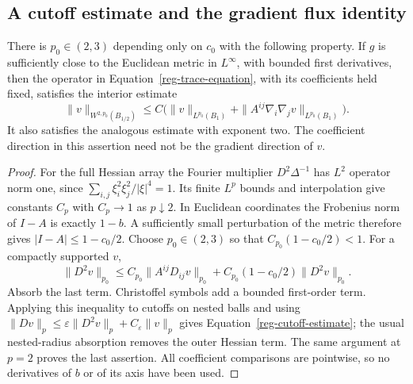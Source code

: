 \subsection{A cutoff estimate and the gradient flux identity}

\begin{lemma}
\label{reg-cutoff}
There is $p_0\in(2,3)$ depending only on $c_0$ with the following
property. If $g$ is sufficiently close to the Euclidean metric in
$L^\infty$, with bounded first derivatives, then the operator in
Equation~\eqref{reg-trace-equation}, with its coefficients held fixed,
satisfies the interior estimate
\begin{equation}
 \|v\|_{W^{2,p_0}(B_{1/2})}
 \le C\bigl(\|v\|_{L^{p_0}(B_1)}
                 +\|A^{ij}\nabla_i\nabla_jv\|_{L^{p_0}(B_1)}\bigr).
 \label{reg-cutoff-estimate}
\end{equation}
It also satisfies the analogous estimate with exponent two.
The coefficient direction in this assertion need not be the gradient
direction of $v$.
\end{lemma}

\begin{proof}
For the full Hessian array the Fourier multiplier
$D^2\Delta^{-1}$ has $L^2$ operator norm one, since
$\sum_{i,j}\xi_i^2\xi_j^2/|\xi|^4=1$. Its finite $L^p$ bounds and
interpolation give constants $C_p$ with $C_p\longrightarrow1$ as
$p\downarrow2$. In Euclidean coordinates the Frobenius norm of
$I-A$ is exactly $1-b$. A sufficiently small perturbation of the
metric therefore gives
$|I-A|\le1-c_0/2$. Choose $p_0\in(2,3)$ so that
$C_{p_0}(1-c_0/2)<1$. For a compactly supported $v$,
\[
 \|D^2v\|_{p_0}
 \le C_{p_0}\|A^{ij}D_{ij}v\|_{p_0}
       +C_{p_0}(1-c_0/2)\|D^2v\|_{p_0}.
\]
Absorb the last term. Christoffel symbols add a bounded first-order
term. Applying this inequality to cutoffs on nested balls and using
$\|Dv\|_p\le\varepsilon\|D^2v\|_p+C_\varepsilon\|v\|_p$
gives Equation~\eqref{reg-cutoff-estimate}; the usual nested-radius
absorption removes the outer Hessian term. The same argument at
$p=2$ proves the last assertion. All coefficient comparisons are
pointwise, so no derivatives of $b$ or of its axis have been used.
\end{proof}

